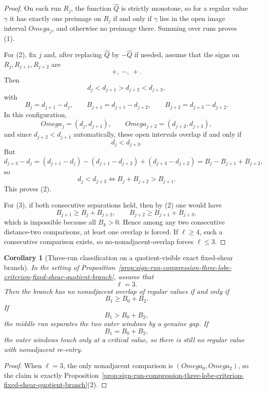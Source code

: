 \documentclass[11pt,a4paper]{amsart}
\def\Omega{Omega}%
\theoremstyle{plain}
\newtheorem{corollary}[theorem]{Corollary}
\theoremstyle{definition}
\begin{document}
\begin{proof}
On each run $R_j$, the function $\widehat Q$ is strictly monotone, so for a
regular value $\gamma$ it has exactly one preimage on $R_j$ if and only if
$\gamma$ lies in the open image interval $\Omega_j$, and otherwise no preimage
there. Summing over runs proves (1).

For (2), fix $j$ and, after replacing $\widehat Q$ by $-\widehat Q$ if needed,
assume that the signs on $R_j,R_{j+1},R_{j+2}$ are
\[
+,\ -, \ +.
\]
Then
\[
d_j<d_{j+1}>d_{j+2}<d_{j+3},
\]
with
\[
B_j=d_{j+1}-d_j,
\qquad
B_{j+1}=d_{j+1}-d_{j+2},
\qquad
B_{j+2}=d_{j+3}-d_{j+2}.
\]
In this configuration,
\[
\Omega_j=(d_j,d_{j+1}),
\qquad
\Omega_{j+2}=(d_{j+2},d_{j+3}),
\]
and since $d_{j+2}<d_{j+1}$ automatically, these open intervals overlap if and
only if
\[
d_j<d_{j+3}.
\]
But
\[
d_{j+3}-d_j
=
(d_{j+1}-d_j)-(d_{j+1}-d_{j+2})+(d_{j+3}-d_{j+2})
=
B_j-B_{j+1}+B_{j+2},
\]
so
\[
d_j<d_{j+3}
\iff
B_j+B_{j+2}>B_{j+1}.
\]
This proves (2).

For (3), if both consecutive separations held, then by (2) one would have
\[
B_{j+1}\ge B_j+B_{j+2},
\qquad
B_{j+2}\ge B_{j+1}+B_{j+3},
\]
which is impossible because all $B_k>0$. Hence among any two consecutive
distance-two comparisons, at least one overlap is forced. If $\ell\ge 4$, such
a consecutive comparison exists, so no-nonadjacent-overlap forces $\ell\le 3$.
\end{proof}

\begin{corollary}[Three-run classification on a quotient-visible exact fixed-shear branch]
\label{cor:three-run-no-reentry-classification-fixed-shear-quotient-branch}
In the setting of
Proposition~\ref{prop:sign-run-compression-three-lobe-criterion-fixed-shear-quotient-branch},
assume that
\[
\ell=3.
\]
Then the branch has no nonadjacent overlap of regular values if and only if
\[
B_1\ge B_0+B_2.
\]
If
\[
B_1>B_0+B_2,
\]
the middle run separates the two outer windows by a genuine gap. If
\[
B_1=B_0+B_2,
\]
the outer windows touch only at a critical value, so there is still no regular
value with nonadjacent re-entry.
\end{corollary}

\begin{proof}
When $\ell=3$, the only nonadjacent comparison is $(\Omega_0,\Omega_2)$, so the
claim is exactly Proposition~\ref{prop:sign-run-compression-three-lobe-criterion-fixed-shear-quotient-branch}(2).
\end{proof}
\end{document}
